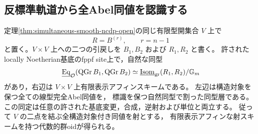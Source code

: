 \subsection{反標準軌道から全Abel同値を認識する}

\begin{theorem}\label{thm:finite-anticanonical-isom}
定理\ref{thm:simultaneous-smooth-ncdp-open}の同じ有限型開集合 $V$ 上で
\[
 R=B^{(r)},\qquad r=n-1
\]
と置く。$V\times V$ 上への二つの引戻しを $B_1,B_2$ および $R_1,R_2$ と書く。
許されたlocally Noetherian基底のfppf site上で，自然な同型
\begin{equation}\label{eq:finite-anticanonical-isom}
 \underline{\operatorname{Eq}}_{\mathcal O}
       (\operatorname{QGr} B_1,\operatorname{QGr} B_2)
  \simeq
 \underline{\operatorname{Isom}}_{\mathrm{gr}}(R_1,R_2)/\mathbb G_m
\end{equation}
があり，右辺は $V\times V$ 上有限表示アフィンスキームである。
左辺は構造対象を保つ全ての線型完全Abel同値を，
標識を保つ自然同型で割った同型層である。
この同定は任意の許された基底変更，合成，逆射および単位と両立する。
従って $V$ の二点を結ぶ全構造対象付き同値を射とする，
有限表示アフィンな射スキームを持つ代数的群oidが得られる。
\end{theorem}
